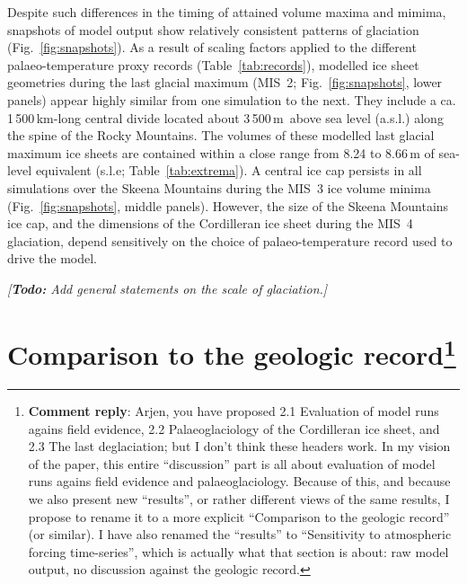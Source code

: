 \documentclass[tc, manuscript]{copernicus}
\newcommand{\renote}[1]{\footnote{\textbf{Comment reply}: #1}}
\newcommand{\todo}[1]{\emph{[\textbf{Todo:} #1]}}
\begin{document}
Despite such differences in the timing of attained volume maxima and mimima,
snapshots of model output show relatively consistent patterns of glaciation
(Fig.~\ref{fig:snapshots}). As a result of scaling factors applied to the
different palaeo-temperature proxy records (Table~\ref{tab:records}), modelled
ice sheet geometries during the last glacial maximum (MIS~2;
Fig.~\ref{fig:snapshots}, lower panels) appear highly similar from one
simulation to the next. They include a ca. 1\,500\,km-long central divide
located about 3\,500\,m\ above sea level (a.s.l.) along the spine of the Rocky
Mountains. The volumes of these modelled last glacial maximum ice sheets are
contained within a close range from 8.24 to 8.66\,m of sea-level equivalent
(s.l.e; Table~\ref{tab:extrema}).
A central ice cap persists in all simulations over the Skeena
Mountains during the MIS~3 ice volume minima (Fig.~\ref{fig:snapshots}, middle
panels). However, the size of the Skeena Mountains ice cap, and the dimensions
of the Cordilleran ice sheet during the MIS~4 glaciation, depend sensitively on
the choice of palaeo-temperature record used to drive the model.

\todo{Add general statements on the scale of glaciation.}

\section[Comparison to the geologic record]
        {Comparison to the geologic record\renote{
    Arjen, you have proposed 2.1 Evaluation of model runs agains field
    evidence, 2.2 Palaeoglaciology of the Cordilleran ice sheet, and 2.3 The
    last deglaciation; but I don't think these headers work. In my vision of
    the paper, this entire ``discussion'' part is all about evaluation of model
    runs agains field evidence and palaeoglaciology. Because of this, and
    because we also present new ``results'', or rather different views of the
    same results, I propose to rename it to a more explicit ``Comparison to the
    geologic record'' (or similar). I have also renamed the ``results'' to
    ``Sensitivity to atmospheric forcing time-series'', which is actually what
    that section is about: raw model output, no discussion against the geologic
    record.}}
\label{sec:discussion}

\end{document}
